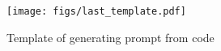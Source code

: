 \begin{figure}
    \centering
    \texttt{[image: figs/last\_template.pdf]}
    \caption{Template of generating prompt from code}
    
    \label{fig:code_prompt}
    \vspace{-10pt}
    
\end{figure}